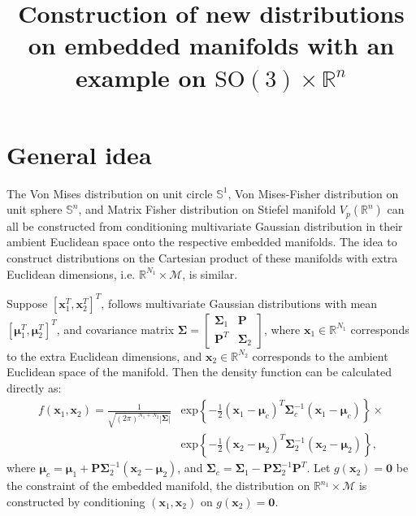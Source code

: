 \documentclass[12pt]{article}
\title{\vspace{-4ex}\textbf{Construction of new distributions on embedded manifolds with an example on $\text{SO}(3)\times\mathbb{R}^n$}\vspace{-4ex}}
\date{}
\begin{document}
\maketitle

\section{General idea} \label{sec:generalIdea}
The Von Mises distribution on unit circle $\mathbb{S}^1$, Von Mises-Fisher distribution on unit sphere $\mathbb{S}^n$, and Matrix Fisher distribution on Stiefel manifold $V_p(\mathbb{R}^n)$ can all be constructed from conditioning multivariate Gaussian distribution in their ambient Euclidean space onto the respective embedded manifolds.
The idea to construct distributions on the Cartesian product of these manifolds with extra Euclidean dimensions, i.e. $\mathbb{R}^{N_1}\times\mathcal{M}$, is similar.

Suppose $[\bm{x}_1^T,\bm{x}_2^T]^T$, follows multivariate Gaussian distributions with mean $[\bm{\mu}_1^T,\bm{\mu}_2^T]^T$, and covariance matrix $\mathbf{\Sigma} = \left[\begin{matrix}\mathbf{\Sigma}_1&\mathbf{P} \\\mathbf{P}^T&\mathbf{\Sigma}_2\end{matrix}\right]$, where $\bm{x}_1\in\mathbb{R}^{N_1}$ corresponds to the extra Euclidean dimensions, and $\bm{x}_2\in\mathbb{R}^{N_2}$ corresponds to the ambient Euclidean space of the manifold.
Then the density function can be calculated directly as:
\begin{equation} \label{eqn:MultiGaussian}
	\begin{split}
		f(\bm{x}_1,\bm{x}_2) = \frac{1}{\sqrt{(2\pi)^{N_1+N_2}|\mathbf{\Sigma}|}} &\text{exp}\left\{-\frac{1}{2}(\bm{x}_1-\bm{\mu}_c)^T\mathbf{\Sigma}_c^{-1}(\bm{x}_1-\bm{\mu}_c)\right\}\times \\
		&\text{exp}\left\{-\frac{1}{2}(\bm{x}_2-\bm{\mu}_2)^T\mathbf{\Sigma}_2^{-1}(\bm{x}_2-\bm{\mu}_2)\right\},
	\end{split}
\end{equation}
where $\bm{\mu}_c = \bm{\mu}_1+\mathbf{P}\mathbf{\Sigma}_2^{-1}(\bm{x}_2-\bm{\mu}_2)$, and $\mathbf{\Sigma}_c = \mathbf{\Sigma}_1-\mathbf{P}\mathbf{\Sigma}_2^{-1}\mathbf{P}^T$.
Let $g(\bm{x}_2)=\bm{0}$ be the constraint of the embedded manifold, the distribution on $\mathbb{R}^{n_1}\times\mathcal{M}$ is constructed by conditioning $(\bm{x}_1,\bm{x}_2)$ on $g(\bm{x}_2)=\bm{0}$.
\end{document}
